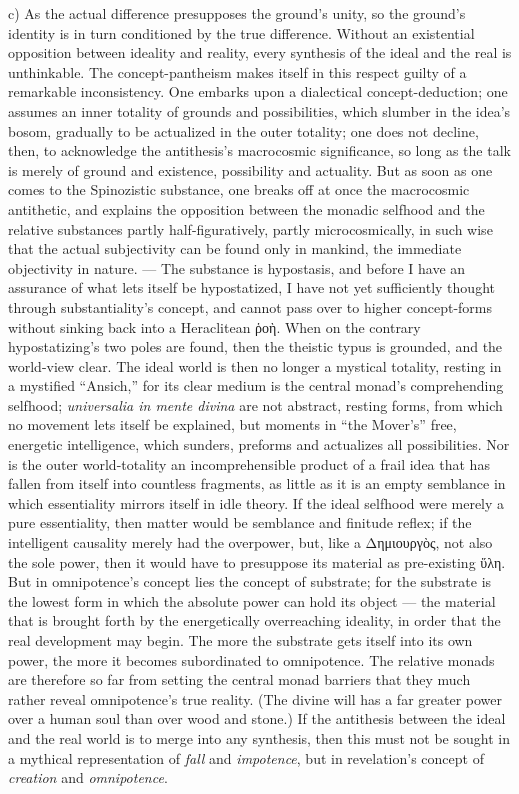 \documentclass[12pt]{book}
\begin{document}
c) As the actual difference presupposes the ground's unity, so the ground's
identity is in turn conditioned by the true difference. Without an
existential opposition between ideality and reality, every synthesis of the
ideal and the real is unthinkable. The concept-pantheism makes itself in
this respect guilty of a remarkable inconsistency. One embarks upon a
dialectical concept-deduction; one assumes an inner totality of grounds and
possibilities, which slumber in the idea's bosom, gradually to be actualized
in the outer totality; one does not decline, then, to acknowledge the
antithesis's macrocosmic significance, so long as the talk is merely of
ground and existence, possibility and actuality. But as soon as one comes to
the Spinozistic substance, one breaks off at once the macrocosmic
antithetic, and explains the opposition between the monadic selfhood and the
relative substances partly half-figuratively, partly microcosmically, in
such wise that the actual subjectivity can be found only in mankind, the
immediate objectivity in nature. --- The substance is hypostasis, and before
I have an assurance of what lets itself be hypostatized, I have not yet
sufficiently thought through substantiality's concept, and cannot pass over
to higher concept-forms without sinking back into a Heraclitean ῥοὴ. When on
the contrary hypostatizing's two poles are found, then the theistic typus is
grounded, and the world-view clear. The ideal world is then no longer a
mystical totality, resting in a mystified ``Ansich,'' for its clear medium
is the central monad's comprehending selfhood; \textit{universalia in mente
divina} are not abstract, resting forms, from which no movement lets itself
be explained, but moments in ``the Mover's'' free, energetic intelligence,
which sunders, preforms and actualizes all possibilities. Nor is the outer
world-totality an incomprehensible product of a frail idea that has fallen
from itself into countless fragments, as little as it is an empty semblance
in which essentiality mirrors itself in idle theory. If the ideal selfhood
were merely a pure essentiality, then matter would be semblance and finitude
reflex; if the intelligent causality merely had the overpower, but, like a
Δημιουργὸς, not also the sole power, then it would have to presuppose its
material as pre-existing ὕλη. But in omnipotence's concept lies the concept
of substrate; for the substrate is the lowest form in which the absolute
power can hold its object --- the material that is brought forth by the
energetically overreaching ideality, in order that the real development may
begin. The more the substrate gets itself into its own power, the more it
becomes subordinated to omnipotence. The relative monads are therefore so
far from setting the central monad barriers that they much rather reveal
omnipotence's true reality. (The divine will has a far greater power over a
human soul than over wood and stone.) If the antithesis between the ideal
and the real world is to merge into any synthesis, then this must not be
sought in a mythical representation of \emph{fall} and \emph{impotence}, but
in revelation's concept of \emph{creation} and \emph{omnipotence}.
\end{document}

